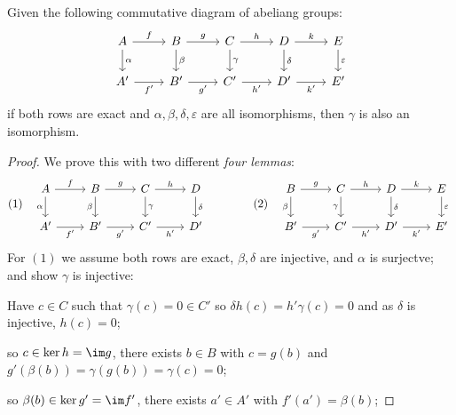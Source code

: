 \documentclass{article}
\begin{document}
\begin{lemma}
    Given the following commutative diagram of abeliang groups:\[\begin{tikzcd}
        A \arrow[r, "f"] \arrow[d, "\alpha"] &
        B \arrow[r, "g"] \arrow[d, "\beta"] &
        C \arrow[r, "h"] \arrow[d, "\gamma"] &
        D \arrow[r, "k"] \arrow[d, "\delta"] &
        E \arrow[d, "\varepsilon"] \\
        A' \arrow[r, "f'", swap] &
        B' \arrow[r, "g'", swap] &
        C' \arrow[r, "h'", swap] &
        D' \arrow[r, "k'", swap] &
        E'
    \end{tikzcd}\]
    if both rows are exact and $\alpha,\beta,\delta,\varepsilon$ are all isomorphisms, then $\gamma$ is also an isomorphism.
    \begin{proof}
        We prove this with two different \textit{four lemmas}:\[
        (1)\quad
        \begin{tikzcd}
            A \arrow[r, "f"] \arrow[d, "\alpha", swap] &
            B \arrow[r, "g"] \arrow[d, "\beta", swap] &
            C \arrow[r, "h"] \arrow[d, "\gamma"] &
            D \arrow[d, "\delta"] \\
            A' \arrow[r, "f'", swap] &
            B' \arrow[r, "g'", swap] &
            C' \arrow[r, "h'", swap] &
            D'
        \end{tikzcd}
        \qquad \qquad
        (2)\quad
        \begin{tikzcd}
            B \arrow[r, "g"] \arrow[d, "\beta", swap] &
            C \arrow[r, "h"] \arrow[d, "\gamma", swap] &
            D \arrow[r, "k"] \arrow[d, "\delta"] &
            E \arrow[d, "\varepsilon"] \\
            B' \arrow[r, "g'", swap] &
            C' \arrow[r, "h'", swap] &
            D' \arrow[r, "k'", swap] &
            E'
        \end{tikzcd}
        \]
    For $(1)$ we assume both rows are exact, $\beta,\delta$ are injective, and $\alpha$ is surjectve; and show $\gamma$ is injective:

        Have $c\in C$ such that $\gamma(c)=0\in C'$ so $\delta h(c) = h'\gamma(c) = 0$ and as $\delta$ is injective, $h(c)=0$;

        so $c\in \ker h = \im g$, there exists $b\in B$ with $c=g(b)$ and $g'(\beta(b)) = \gamma(g(b)) = \gamma(c) = 0$;

        so $\beta(b)\in\ker g'=\im f'$, there exists $a'\in A'$ with $f'(a') = \beta(b)$;


\end{proof}
\end{lemma}
\end{document}
